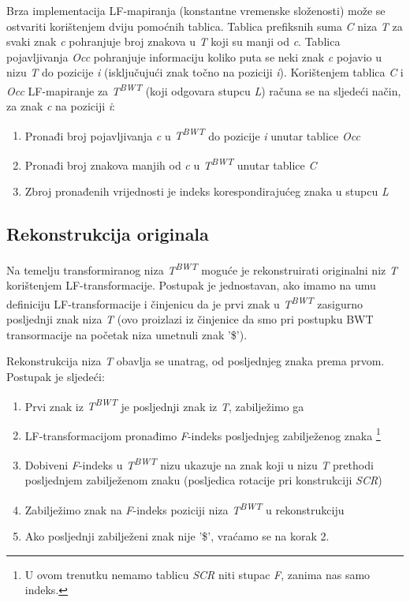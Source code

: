 \documentclass[times, utf8, seminar, numeric]{fer}
\begin{document}
Brza implementacija LF-mapiranja (konstantne
vremenske složenosti) može se ostvariti korištenjem dviju pomoćnih tablica. Tablica
prefiksnih suma \textit{C}  niza \textit{T} za svaki znak \textit{c}
pohranjuje broj znakova u \textit{T} koji su manji od \textit{c}. Tablica pojavljivanja
\textit{Occ}  pohranjuje informaciju koliko puta se neki znak
\textit{c} pojavio u nizu \textit{T} do pozicije \textit{i} (isključujući znak točno na
poziciji \textit{i}). Korištenjem tablica \textit{C} i \textit{Occ} LF-mapiranje za
\textit{T\textsuperscript{BWT}} (koji odgovara stupcu \textit{L}) računa se na sljedeći način,
za znak \textit{c} na poziciji \textit{i}:

\begin{enumerate}
  \item{Pronađi broj pojavljivanja \textit{c} u \textit{T\textsuperscript{BWT}} do pozicije \textit{i} unutar tablice \textit{Occ}}
  \item{Pronađi broj znakova manjih od \textit{c} u \textit{T\textsuperscript{BWT}} unutar tablice \textit{C}}
  \item{Zbroj pronađenih vrijednosti je indeks korespondirajućeg znaka u stupcu \textit{L}}
\end{enumerate}

\subsection{Rekonstrukcija originala}

Na temelju transformiranog niza \textit{T\textsuperscript{BWT}} moguće je rekonstruirati
originalni niz \textit{T} korištenjem LF-transformacije. Postupak je jednostavan, ako imamo
na umu definiciju LF-transformacije i činjenicu da je prvi znak u \textit{T\textsuperscript{BWT}}
zasigurno posljednji znak niza \textit{T} (ovo proizlazi iz činjenice da smo pri postupku BWT
transormacije na početak niza umetnuli znak '\$').

Rekonstrukcija niza \textit{T} obavlja se unatrag, od posljednjeg znaka prema prvom. Postupak
je sljedeći:

\begin{enumerate}
  \item{Prvi znak iz \textit{T\textsuperscript{BWT}} je posljednji znak iz \textit{T}, zabilježimo ga}
  \item{LF-transformacijom pronađimo \textit{F}-indeks  posljednjeg zabilježenog znaka \footnote{
    U ovom trenutku nemamo tablicu \textit{SCR} niti stupac \textit{F}, zanima nas samo indeks.}}
  \item{Dobiveni \textit{F}-indeks u \textit{T\textsuperscript{BWT}} nizu ukazuje na znak koji u nizu
    \textit{T} prethodi posljednjem zabilježenom znaku (posljedica rotacije pri konstrukciji \textit{SCR})}
  \item{Zabilježimo znak na \textit{F}-indeks poziciji niza \textit{T\textsuperscript{BWT}} u rekonstrukciju}
  \item{Ako posljednji zabilježeni znak nije '\$', vraćamo se na korak 2.}
\end{enumerate}
\end{document}
